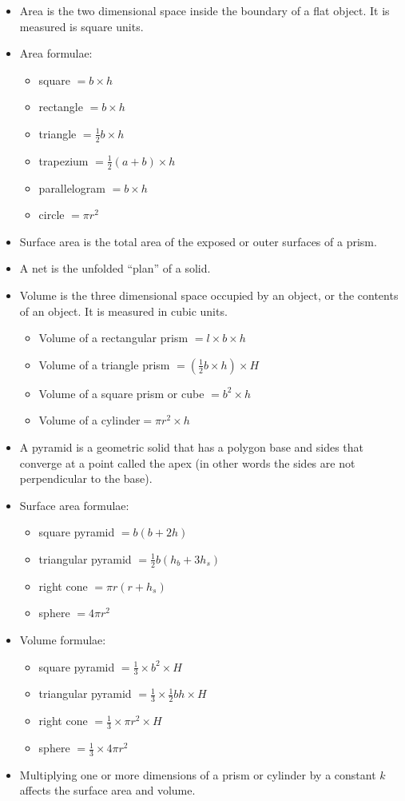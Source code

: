 \begin{itemize}
\item Area is the two dimensional space inside the boundary of a flat
  object. It is measured is square units.
\item Area formulae:
  \begin{itemize}
  \item square $= b \times h$
  \item rectangle $= b \times h$
  \item triangle $= \frac{1}{2} b \times h$
  \item trapezium $= \frac{1}{2} (a+b) \times h$
  \item parallelogram $= b \times h$
  \item circle $= \pi r^2$
  \end{itemize}
\item Surface area is the total area of the exposed or outer surfaces of a prism.
\item A net is the unfolded ``plan'' of a solid.
\item Volume is the three dimensional space occupied by an object, or the contents of an
  object. It is measured in cubic units.
  \begin{itemize}
  \item Volume of a rectangular prism $=l \times b \times h$
  \item Volume of a triangle prism $= (\frac{1}{2} b \times h) \times H$
  \item Volume of a square prism or cube $=b^2 \times h$
  \item Volume of a cylinder$=\pi r^2 \times h$
  \end{itemize}
\item A pyramid is a geometric solid that has a polygon base and sides that converge at a
  point called the apex (in other words the sides are not perpendicular to the base).
\item Surface area formulae:
  \begin{itemize}
  \item square pyramid $=b(b+2h)$
  \item triangular pyramid $= \frac{1}{2}b(h_b +3h_s)$
  \item right cone $= \pi r(r+h_s)$
  \item sphere $= 4\pi r^2$
  \end{itemize}
\item Volume formulae:
  \begin{itemize}[noitemsep]
  \item square pyramid $=\frac{1}{3} \times b^2 \times H$
  \item triangular pyramid $= \frac{1}{3} \times \frac{1}{2}bh \times H$
  \item right cone $= \frac{1}{3} \times \pi r^2 \times H$
  \item sphere $= \frac{1}{3} \times 4\pi r^2$
  \end{itemize}
\item Multiplying one or more dimensions of a prism or cylinder by a constant $k$ affects the surface area and volume.
\end{itemize}

